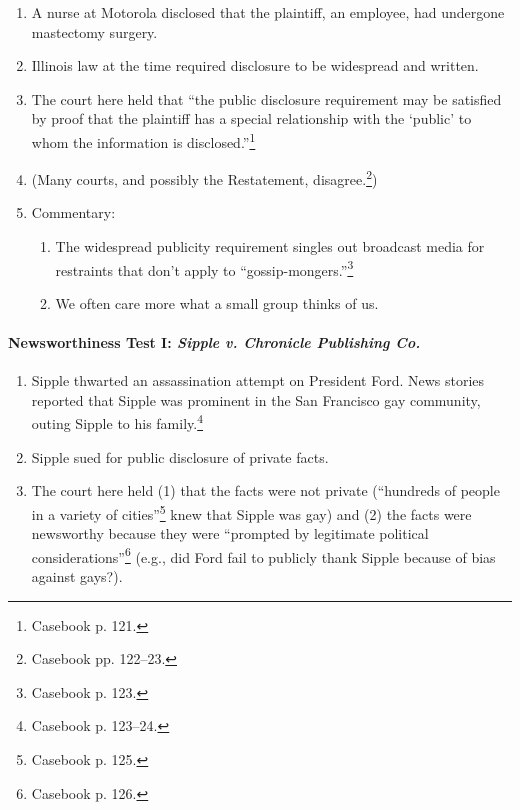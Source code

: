 \begin{enumerate}
    \item A nurse at Motorola disclosed that the plaintiff, an employee, had 
    undergone mastectomy surgery.
    \item Illinois law at the time required disclosure to be widespread and 
    written.
    \item The court here held that ``the public disclosure requirement may be 
    satisfied by proof that the plaintiff has a special relationship with the 
    `public' to whom the information is disclosed.''\footnote{Casebook p. 121.}
    \item (Many courts, and possibly the Restatement, 
    disagree.\footnote{Casebook pp. 122--23.})
    \item Commentary:
    \begin{enumerate}
        \item The widespread publicity requirement singles out broadcast media 
        for restraints that don't apply to ``gossip-mongers.''\footnote{Casebook 
        p. 123.}
        \item We often care more what a small group thinks of us.
    \end{enumerate}
\end{enumerate}

\paragraph{Newsworthiness Test I: \emph{Sipple v. Chronicle Publishing Co.}}

\begin{enumerate}
    \item Sipple thwarted an assassination attempt on President Ford. News 
    stories reported that Sipple was prominent in the San Francisco gay 
    community, outing Sipple to his family.\footnote{Casebook p. 123--24.}
    \item Sipple sued for public disclosure of private facts.
    \item The court here held (1) that the facts were not private (``hundreds of 
    people in a variety of cities''\footnote{Casebook p. 125.} knew that Sipple 
    was gay) and (2) the facts were newsworthy because they were ``prompted by 
    legitimate political considerations''\footnote{Casebook p. 126.} (e.g., did 
    Ford fail to publicly thank Sipple because of bias against gays?).
\end{enumerate}

